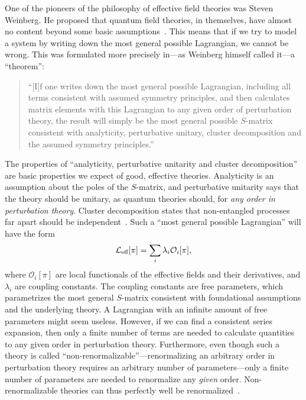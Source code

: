 One of the pioneers of the philosophy of effective field theories was Steven Weinberg.
He proposed that quantum field theories, in themselves, have almost no content beyond some basic assumptions~\autocite{weinbergDevelopmentEffectiveField2021}.
This means that if we try to model a system by writing down the most general possible Lagrangian, we cannot be wrong.
This was formulated more precisely in---as Weinberg himself called it---a ``theorem'':
%
\begin{quote}
    ``[I]f one writes down the most general possible Lagrangian, including all terms consistent with assumed symmetry principles, and then calculates matrix elements with this Lagrangian to any given order of perturbation theory, the result will simply be the most general possible $S$-matrix consistent with analyticity, perturbative unitary, cluster decomposition and the assumed symmetry principles.''~\autocite{weinbergPhenomenologicalLagrangians1979a}
\end{quote}
%
The properties of ``analyticity, perturbative unitarity and cluster decomposition'' are basic properties we expect of good, effective theories.
Analyticity is an assumption about the poles of the $S$-matrix, and perturbative unitarity says that the theory should be unitary, as quantum theories should, for \emph{any order in perturbation theory}.
Cluster decomposition states that non-entangled processes far apart should be independent~\autocite{weinbergQuantumTheoryFields1995,weinbergQuantumTheoryFields1996}.
Such a ``most general possible Lagrangian'' will have the form
\begin{equation}
    \mathcal{L}_\text{eff}[\pi] = \sum_i \lambda_i \mathcal O_i[\pi],
\end{equation}
where $\mathcal O_i[\pi]$ are local functionals of the effective fields and their derivatives, and $\lambda_i$ are coupling constants.
The coupling constants are free parameters, which parametrizes the most general $S$-matrix consistent with foundational assumptions and the underlying theory.
A Lagrangian with an infinite amount of free parameters might seem useless.
However, if we can find a consistent series expansion, then only a finite number of terms are needed to calculate quantities to any given order in perturbation theory.
Furthermore, even though such a theory is called ``non-renormalizable''---renormalizing an arbitrary order in perturbation theory requires an arbitrary number of parameters---only a finite number of parameters are needed to renormalize any \emph{given} order.
Non-renormalizable theories can thus perfectly well be renormalized~\autocite{schwartzQuantumFieldTheory2013}.

